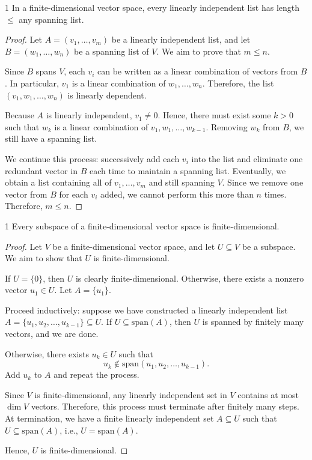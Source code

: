 \documentclass[11pt]{article}
\begin{document}
\begin{theorem}{}{1}
In a finite-dimensional vector space, every linearly independent list has length $\leq$ any spanning list.
\end{theorem}
\begin{proof}
Let $A = (v_1, \dots, v_m)$ be a linearly independent list, and let $B = (w_1, \dots, w_n)$ be a spanning list of $V$. We aim to prove that $m \leq n$.

 Since $B$ spans $V$, each $v_i$ can be written as a linear combination of vectors from $B$. In particular, $v_1$ is a linear combination of $w_1, \dots, w_n$. Therefore, the list $(v_1, w_1, \dots, w_n)$ is linearly dependent.
 
 Because $A$ is linearly independent, $v_1 \neq 0$. Hence, there must exist some $k > 0$ such that $w_k$ is a linear combination of $v_1, w_1, \dots, w_{k-1}$. Removing $w_k$ from $B$, we still have a spanning list.
 
 We continue this process: successively add each $v_i$ into the list and eliminate one redundant vector in $B$ each time to maintain a spanning list. Eventually, we obtain a list containing all of $v_1, \dots, v_m$ and still spanning $V$. Since we remove one vector from $B$ for each $v_i$ added, we cannot perform this more than $n$ times. Therefore, $m \leq n$.
\end{proof}

\begin{theorem}{}{1}
Every subspace of a finite-dimensional vector space is finite-dimensional.
\end{theorem}
\begin{proof}
 Let $V$ be a finite-dimensional vector space, and let $U \subseteq V$ be a subspace.  
 We aim to show that $U$ is finite-dimensional.
 
 If $U = \{0\}$, then $U$ is clearly finite-dimensional.  
 Otherwise, there exists a nonzero vector $u_1 \in U$.  
 Let $A = \{u_1\}$.
 
 Proceed inductively: suppose we have constructed a linearly independent list $A = \{u_1, u_2, \dots, u_{k-1}\} \subseteq U$.  
 If $U \subseteq \mathrm{span}(A)$, then $U$ is spanned by finitely many vectors, and we are done.
 
 Otherwise, there exists $u_k \in U$ such that  
 $$
 u_k \notin \mathrm{span}(u_1, u_2, \dots, u_{k-1}).
 $$  
 Add $u_k$ to $A$ and repeat the process.
 
 Since $V$ is finite-dimensional, any linearly independent set in $V$ contains at most $\dim V$ vectors.  
 Therefore, this process must terminate after finitely many steps.  
 At termination, we have a finite linearly independent set $A \subseteq U$ such that $U \subseteq \mathrm{span}(A)$,  
 i.e., $U = \mathrm{span}(A)$.
 
 Hence, $U$ is finite-dimensional. 
\end{proof}
\end{document}
